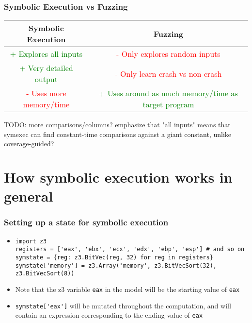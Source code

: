 \documentclass[aspectratio=169]{beamer}
\begin{document}
\begin{frame}[fragile]
\frametitle{Symbolic Execution vs Fuzzing}
\begin{tabular}{c|c}
Symbolic Execution & Fuzzing\\\hline
\textcolor{green}{+ Explores all inputs} & \textcolor{red}{- Only explores random inputs}\\
\textcolor{green}{+ Very detailed output} & \textcolor{red}{- Only learn crash vs non-crash}\\
\textcolor{red}{- Uses more memory/time} & \textcolor{green}{+ Uses around as much memory/time as target program}
\end{tabular}
TODO: more comparisons/columns? emphasize that "all inputs" means that symexec can find constant-time comparisons against a giant constant, unlike coverage-guided?
\end{frame}

\section{How symbolic execution works in general}

\begin{frame}[fragile]
\frametitle{Setting up a state for symbolic execution}
\begin{itemize}
\item \begin{Verbatim}[fontsize=\scriptsize, frame=single]
import z3
registers = ['eax', 'ebx', 'ecx', 'edx', 'ebp', 'esp'] # and so on
symstate = {reg: z3.BitVec(reg, 32) for reg in registers}
symstate['memory'] = z3.Array('memory', z3.BitVecSort(32), z3.BitVecSort(8))
\end{Verbatim}
\item Note that the z3 variable \verb|eax| in the model will be the starting value of \verb|eax|
\item \verb|symstate['eax']| will be mutated throughout the computation, and will contain an expression corresponding to the ending value of \verb|eax|
\end{itemize}
\end{frame}
\end{document}
